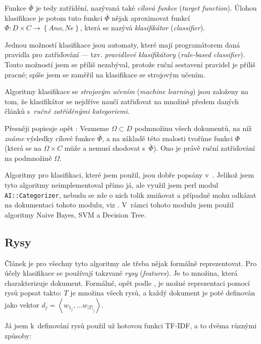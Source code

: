 \documentclass[12pt,a4paper]{report}
\begin{document}
Funkce $\bar{\Phi}$ je tedy  zatřídění, nazývaná také \emph{cílová funkce} (\emph{target function}). Úlohou klasifikace je potom tuto funkci $\bar{\Phi}$ nějak aproximovat funkcí $\Phi: D \times C \rightarrow \left\{Ano, Ne\right\}$, která se nazývá \emph{klasifikátor} (\emph{classifier}).

Jednou možností klasifikace jsou automaty, které mají programátorem daná pravidla pro zatřiďování --- tzv. \emph{pravidlové klasifikátory} (\emph{rule-based classifier}). Touto možností jsem se příliš nezabýval, protože ruční sestavení pravidel je příliš pracné; spíše jsem se zaměřil na klasifikace se strojovým učením.

Algoritmy klasifikace se \emph{strojovým učením} (\emph{machine learning}) jsou založeny na tom, že klasifikátor se nejdříve naučí zatřiďovat na množině předem daných článků s~\emph{ručně zatříděnými kategoriemi}.

Přesněji popisuje opět \cite{machine_intro}: Vezmeme $\Omega \subset D$ podmnožinu všech dokumentů, na níž \emph{známe} výsledky cílové funkce $\bar{\Phi}$, a na základě této znalosti tvoříme funkci $\Phi$ (která se na $\Omega\times C$ může a nemusí shodovat s~$\bar{\Phi}$). Ono  je právě ruční zatřiďování na podmnožině $\Omega$.

Algoritmy pro klasifikaci, které jsem použil, jsou dobře popsány v~\cite{machine_intro}. Jelikož jsem tyto algoritmy neimplementoval přímo já, ale využil jsem perl modul \texttt{AI::Categorizer}, nebudu se zde o nich tolik zmiňovat a případně mohu odkázat na dokumentaci tohoto mo\-du\-lu, viz \cite{algorithmnaivebayes}. V~rámci tohoto mo\-du\-lu jsem použil algoritmy Naive Bayes, SVM a Decision Tree.


\subsection{Rysy}

Článek je pro všechny tyto algoritmy ale třeba nějak formálně reprezentovat. Pro účely klasifikace se používají takzvané \emph{rysy} (\emph{features}). Je to množina, která charakterizuje dokument. Formálně, opět podle \cite{machine_intro}, je možné reprezentaci pomocí rysů popsat takto: $T$ je množina všech rysů, a každý dokument je poté definován jako vektor $d_j=\left<w_{1_j}, \ldots w_{\left|T\right|_j}\right>$.

Já jsem k~definování rysů použil už hotovou funkci TF-IDF, a to dvěma různými způsoby:
\end{document}
